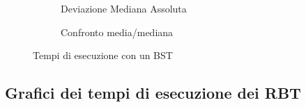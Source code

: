 \documentclass[a4paper,titlepage]{article}
\begin{document}
\begin{figure}[h]
  \centering
  \begin{subfigure}{\textwidth}
     \captionsetup{justification=centering}
     \caption{Deviazione Mediana Assoluta}
     \label{fig:bst_mad}
  \end{subfigure}%
  \vspace{2pt}
  \begin{subfigure}{\textwidth}
     \captionsetup{justification=centering}
     \caption{Confronto media/mediana}
     \label{fig:bst_mean_median}
  \end{subfigure}
  \caption{Tempi di esecuzione con un BST}
\end{figure}
\newpage

\subsection{Grafici dei tempi di esecuzione dei RBT }
\end{document}
